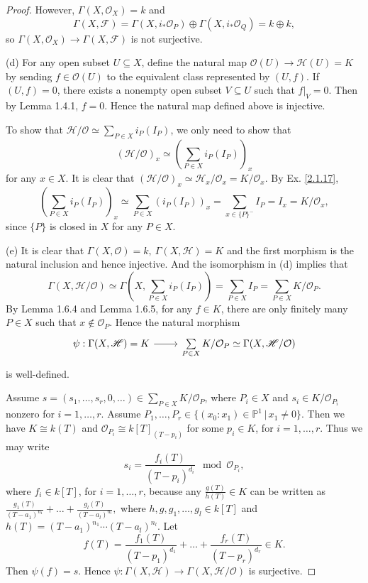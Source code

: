 \documentclass{amsart}
\begin{document}
\begin{proof}
	However, $\Gamma(X,\mathcal{O}_X)=k$ and $$\Gamma(X,\mathscr{F})=\Gamma(X,i_*\mathcal{O}_P)\oplus\Gamma(X,i_*\mathcal{O}_Q)=k\oplus k,$$ so $\Gamma(X,\mathcal{O}_X)\to\Gamma(X,\mathscr{F})$ is not surjective.
	
	(d) For any open subset $U\subseteq X$, define the natural map $\mathcal{O}(U)\to\mathscr{H}(U)=K$ by sending $f\in\mathcal{O}(U)$ to the equivalent class represented by $(U,f)$. If $(U,f)=0$, there exists a nonempty open subset $V\subseteq U$ such that $f|_V=0$. Then by Lemma 1.4.1, $f=0$. Hence the natural map defined above is injective.
	
	To show that $\mathscr{H}/\mathcal{O}\simeq\sum_{P\in X}i_P(I_P)$, we only need to show that $$(\mathscr{H}/\mathcal{O})_x\simeq\left(\sum_{P\in X}i_P(I_P)\right)_x$$ for any $x\in X$. It is clear that $(\mathscr{H}/\mathcal{O})_x\simeq\mathscr{H}_x/\mathcal{O}_x=K/\mathcal{O}_x$. By Ex. \ref{2.1.17}, $$\left(\sum_{P\in X}i_P(I_P)\right)_x\simeq\sum_{P\in X}(i_P(I_P))_x=\sum_{x\in\{P\}^-}I_P=I_x=K/\mathcal{O}_x,$$ since $\{P\}$ is closed in $X$ for any $P\in X$.
	
	(e) It is clear that $\Gamma(X,\mathcal{O})=k,\ \Gamma(X,\mathscr{H})=K$ and the first morphism is the natural inclusion and hence injective. And the isomorphism in (d) implies that $$\Gamma(X,\mathscr{H}/\mathcal{O})\simeq\Gamma\left(X,\sum_{P\in X}i_P(I_P)\right)=\sum_{P\in X}I_P=\sum_{P\in X}K/\mathcal{O}_P.$$ By Lemma 1.6.4 and Lemma 1.6.5, for any $f\in K$, there are only finitely many $P\in X$ such that $x\notin\mathcal{O}_P$. Hence the natural morphism 
	\begin{equation*}
		\begin{tikzcd}
			{\psi:\Gamma(X,\mathscr{H})=K} \arrow[r] & {\sum\limits_{P\in X}K/\mathcal{O}_P\simeq\Gamma(X,\mathscr{H}/\mathcal{O})}
		\end{tikzcd}
	\end{equation*}
	is well-defined.
	
	Assume $s=(s_1,\dots,s_r,0,\dots)\in\sum_{P\in X}K/\mathcal{O}_P$, where $P_i\in X$ and $s_i\in K/\mathcal{O}_{P_i}$ nonzero for $i=1,\dots,r$. Assume $P_1,\dots,P_r\in\{(x_0:x_1)\in\mathbb{P}^1\,|\,x_1\neq0\}$. Then we have $K\cong k(T)$ and $\mathcal{O}_{P_i}\cong k[T]_{(T-p_i)}$ for some $p_i\in K$, for $i=1,\dots,r$. Thus we may write $$s_i=\frac{f_i(T)}{(T-p_i)^{d_i}}\mod\mathcal{O}_{P_i},$$ where $f_i\in k[T]$, for $i=1,\dots,r$, because any $\frac{g(T)}{h(T)}\in K$ can be written as $\frac{g_1(T)}{(T-a_1)^{n_1}}+\dots+\frac{g_l(T)}{(T-a_l)^{n_l}},$ where $h,g,g_1,\dots,g_l\in k[T]$ and $h(T)=(T-a_1)^{n_1}\cdots(T-a_l)^{n_l}$. Let $$f(T)=\frac{f_1(T)}{(T-p_1)^{d_1}}+\dots+\frac{f_r(T)}{(T-p_r)^{d_r}}\in K.$$ Then $\psi(f)=s$. Hence $\psi:\Gamma(X,\mathscr{H})\to\Gamma(X,\mathscr{H}/\mathcal{O})$ is surjective.
	

\end{proof}
\end{document}
